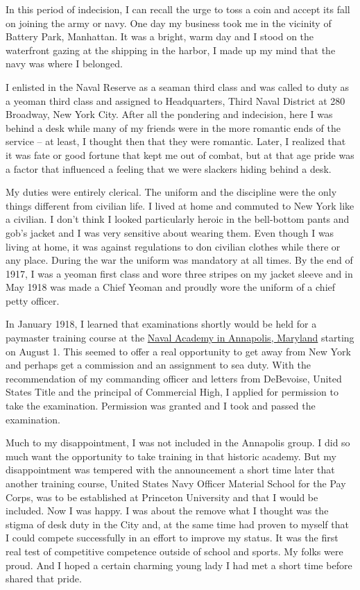 \documentclass[12pt]{book}              %
\begin{document}
In this period of indecision, I can recall the urge to toss a coin and accept its fall on joining the army or navy. One day my business took me in the vicinity of Battery Park, Manhattan. It was a bright, warm day and I stood on the waterfront gazing at the shipping in the harbor, I made up my mind that the navy was where I belonged. 

I enlisted in the Naval Reserve as a seaman third class and was called to duty as a yeoman third class and assigned to Headquarters, Third Naval District at 280 Broadway, New York City. After all the pondering and indecision, here I was behind a desk while many of my friends were in the more romantic ends of the service -- at least, I thought then that they were romantic. Later, I realized that it was fate or good fortune that kept me out of combat, but at that age pride was a factor that influenced a feeling that we were slackers hiding behind a desk.

My duties were entirely clerical. The uniform and the discipline were the only things different from civilian life. I lived at home and commuted to New York like a civilian. I don't think I looked particularly heroic in the bell-bottom pants and gob's jacket and I was very sensitive about wearing them. Even though I was living at home, it was against regulations to don civilian clothes while there or any place. During the war the uniform was mandatory at all times. By the end of 1917, I was a yeoman first class and wore three stripes on my jacket sleeve and in May 1918 was made a Chief Yeoman and proudly wore the uniform of a chief petty officer. 

In January 1918, I learned that examinations shortly would be held for a paymaster training course at the \href{http://en.wikipedia.org/wiki/United_States_Naval_Academy}{Naval Academy in Annapolis, Maryland} starting on August 1. This seemed to offer a real opportunity to get away from New York and perhaps get a commission and an assignment to sea duty. With the recommendation of my commanding officer and letters from DeBevoise, United States Title and the principal of Commercial High, I applied for permission to take the examination. Permission was granted and I took and passed the examination.

Much to my disappointment, I was not included in the Annapolis group. I did so much want the opportunity to take training in that historic academy. But my disappointment was tempered with the announcement a short time later that another training course, United States Navy Officer Material School for the Pay Corps, was to be established at Princeton University and that I would be included. Now I was happy. I was about the remove what I thought was the stigma of desk duty in the City and, at the same time had proven to myself that I could compete successfully in an effort to improve my status. It was the first real test of competitive competence outside of school and sports. My folks were proud. And I hoped a certain charming young lady I had met a short time before shared that pride. 
\end{document}
